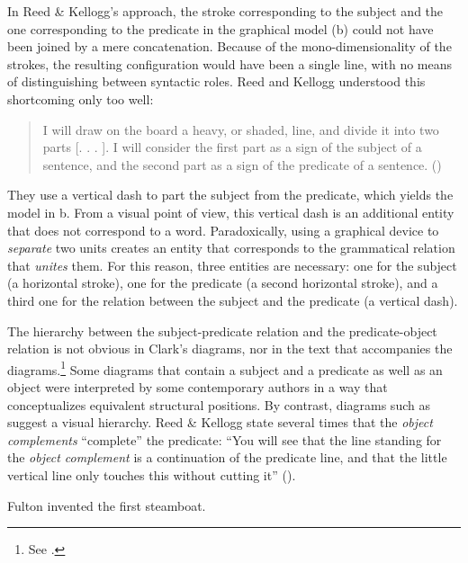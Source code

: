 \documentclass[english,output=paper,colorlinks,citecolor=brown]{../langscibook}
\begin{document}
In Reed \& Kellogg’s approach, the stroke corresponding to the subject and the one corresponding to the predicate in the graphical model (b) could not have been joined by a mere concatenation. Because of the mono-dimensionality of the strokes, the resulting configuration would have been a single line, with no means of distinguishing between syntactic roles. Reed and Kellogg understood this shortcoming only too well:

\begin{quote}
I will draw on the board a heavy, or shaded, line, and divide it into two parts [. . . ]. I will consider the first part as a sign of the subject of a sentence, and the second part as a sign of the predicate of a sentence. (\citealt[17]{ReedBrainerd1879})
\end{quote}

They use a vertical dash to part the subject from the predicate, which yields the model in b. From a visual point of view, this vertical dash is an additional entity that does not correspond to a word. Paradoxically, using a graphical device to \textit{separate} two units creates an entity that corresponds to the grammatical relation that \textit{unites} them. For this reason, three entities are necessary: one for the subject (a horizontal stroke), one for the predicate (a second horizontal stroke), and a third one for the relation between the subject and the predicate (a vertical dash).

The hierarchy between the subject-predicate relation and the predicate-object relation is not obvious in Clark’s diagrams, nor in the text that accompanies the diagrams.\footnote{ \textrm{See \citet[§4.3.2]{ImrenyiMazziotta2020}.}} Some diagrams that contain a subject and a predicate as well as an object were interpreted by some contemporary authors \citep[30]{Jewell1867} in a way that conceptualizes equivalent structural positions. By contrast, diagrams such as  suggest a visual hierarchy. Reed \& Kellogg state several times that the \textit{object complements} “complete” the predicate: “You will see that the line standing for the \textit{object complement} is a continuation of the predicate line, and that the little vertical line only touches this without cutting it” (\citealt[54]{ReedBrainerd1879}).

\ea \label{ex:4:3} Fulton invented the first steamboat.\z
\end{document}

